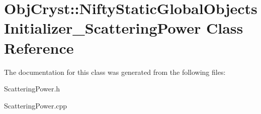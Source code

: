 \hypertarget{class_obj_cryst_1_1_nifty_static_global_objects_initializer___scattering_power}{}\section{Obj\+Cryst\+::Nifty\+Static\+Global\+Objects\+Initializer\+\_\+\+Scattering\+Power Class Reference}
\label{class_obj_cryst_1_1_nifty_static_global_objects_initializer___scattering_power}


The documentation for this class was generated from the following files\+:\begin{DoxyCompactItemize}
\item 
Scattering\+Power.\+h\item 
Scattering\+Power.\+cpp\end{DoxyCompactItemize}
